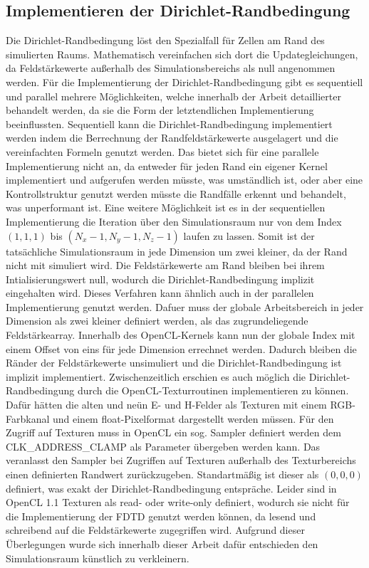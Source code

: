 \documentclass[11pt, ngerman]{article}
\begin{document}
\subsection{Implementieren der Dirichlet-Randbedingung}
Die Dirichlet-Randbedingung l\"ost den Spezialfall f\"ur Zellen am Rand
des simulierten Raums. Mathematisch vereinfachen sich dort die
Updategleichungen, da Feldst\"arkewerte au{\ss}erhalb des Simulationsbereichs
als null angenommen werden. F\"ur die Implementierung der Dirichlet-Randbedingung
gibt es sequentiell und parallel mehrere M\"oglichkeiten, welche innerhalb der Arbeit detaillierter behandelt werden, da sie die
Form der letztendlichen Implementierung beeinflussten.
Sequentiell kann die Dirichlet-Randbedingung implementiert werden indem die Berrechnung
der Randfeldst\"arkewerte ausgelagert und die vereinfachten Formeln genutzt werden. Das bietet sich
f\"ur eine parallele Implementierung nicht an, da entweder f\"ur jeden Rand ein eigener Kernel
implementiert und aufgerufen werden m\"usste, was umst\"andlich ist, oder aber eine Kontrollstruktur
genutzt werden m\"usste die Randf\"alle erkennt und behandelt, was unperformant ist.
Eine weitere M\"oglichkeit ist es in der sequentiellen Implementierung die Iteration \"uber
den Simulationsraum nur von dem Index \((1, 1, 1)\) bis \((N_x - 1, N_y - 1, N_z - 1)\)
laufen zu lassen. Somit ist der tats\"achliche Simulationsraum in jede Dimension um zwei kleiner,
da der Rand nicht mit simuliert wird. Die Feldst\"arkewerte am Rand bleiben bei ihrem Intialisierungswert
null, wodurch die Dirichlet-Randbedingung implizit eingehalten wird.
Dieses Verfahren kann \"ahnlich auch in der parallelen Implementierung genutzt werden.
Dafuer muss der globale Arbeitsbereich in jeder Dimension als zwei kleiner definiert werden, als
das zugrundeliegende Feldst\"arkearray. Innerhalb des OpenCL-Kernels kann nun der globale Index
mit einem Offset von eins f\"ur jede Dimension errechnet werden. Dadurch bleiben die R\"ander der
Feldst\"arkewerte unsimuliert und die Dirichlet-Randbedingung ist implizit implementiert.
Zwischenzeitlich erschien es auch m\"oglich die Dirichlet-Randbedingung durch die
OpenCL-Texturroutinen implementieren zu k\"onnen. Daf\"ur h\"atten die alten und ne\"un E- und H-Felder
als Texturen mit einem RGB-Farbkanal und einem float-Pixelformat dargestellt werden m\"ussen.
F\"ur den Zugriff auf Texturen muss in OpenCL ein sog. Sampler definiert werden
dem CLK\_ADDRESS\_CLAMP als Parameter \"ubergeben werden kann. Das veranlasst den Sampler
bei Zugriffen auf Texturen au{\ss}erhalb des Texturbereichs einen definierten Randwert zur\"uckzugeben.
Standartm\"a{\ss}ig ist dieser als \((0, 0, 0)\) definiert, was exakt der Dirichlet-Randbedingung
entspr\"ache. Leider sind in OpenCL 1.1 Texturen als read- oder write-only definiert,
wodurch sie nicht f\"ur die Implementierung der FDTD genutzt werden k\"onnen, da lesend und schreibend
auf die Feldst\"arkewerte zugegriffen wird. 
Aufgrund dieser \"Uberlegungen wurde sich innerhalb dieser Arbeit daf\"ur entschieden den
Simulationsraum k\"unstlich zu verkleinern.
\end{document}
